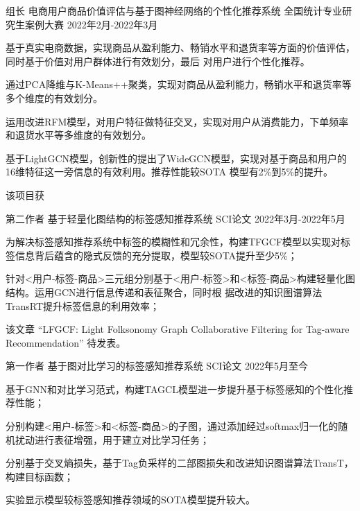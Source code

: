 \begin{cventries}
  \cventry
    {组长} %
    {电商用户商品价值评估与基于图神经网络的个性化推荐系统} %
    {全国统计专业研究生案例大赛} %
    {2022年2月-2022年3月} %
    {
      \begin{cvitems} %
        \item {基于真实电商数据，实现商品从盈利能力、畅销水平和退货率等方面的价值评估，同时基于价值对用户群体进行有效划分，最后
        对用户进行个性化推荐。}
        \item {通过PCA降维与K-Means++聚类，实现对商品从盈利能力，畅销水平和退货率等多个维度的有效划分。}
        \item {运用改进RFM模型，对用户特征做特征交叉，实现对用户从消费能力，下单频率和退货水平等多维度的有效划分。}
        \item {基于LightGCN模型，创新性的提出了WideGCN模型，实现对基于商品和用户的16维特征这一旁信息的有效利用。推荐性能较SOTA
        模型有2\%到5\%的提升。}
        \item {该项目获}
      \end{cvitems}
    }

  \cventry
    {第二作者} %
    {基于轻量化图结构的标签感知推荐系统} %
    {SCI论文} %
    {2022年3月-2022年5月} %
    {
      \begin{cvitems} %
        \item {为解决标签感知推荐系统中标签的模糊性和冗余性，构建TFGCF模型以实现对标签信息背后蕴含的隐式反馈的充分提取，模型较SOTA提升至少5\%；}
        \item {针对<用户-标签-商品>三元组分别基于<用户-标签>和<标签-商品>构建轻量化图结构。运用GCN进行信息传递和表征聚合，同时根
        据改进的知识图谱算法TransRT提升标签信息的利用效率；}
        \item {该文章 “LFGCF: Light Folksonomy Graph Collaborative Filtering for Tag-aware Recommendation” 待发表。}
      \end{cvitems}
    }

  \cventry
    {第一作者} %
    {基于图对比学习的标签感知推荐系统} %
    {SCI论文} %
    {2022年5月至今} %
    {
      \begin{cvitems} %
        \item {基于GNN和对比学习范式，构建TAGCL模型进一步提升基于标签感知的个性化推荐性能；}
        \item {分别构建<用户-标签>和<标签-商品>的子图，通过添加经过softmax归一化的随机扰动进行表征增强，用于建立对比学习任务；}
        \item {分别基于交叉熵损失，基于Tag负采样的二部图损失和改进知识图谱算法TransT，构建目标函数；}
        \item {实验显示模型较标签感知推荐领域的SOTA模型提升较大。}
      \end{cvitems}
    }


\end{cventries}
